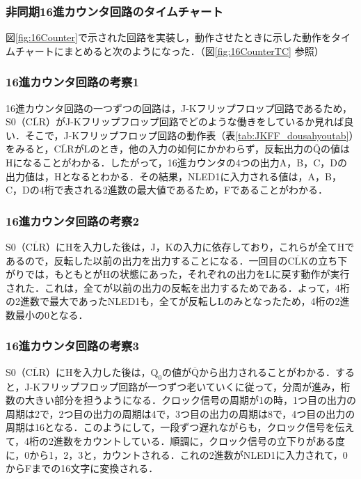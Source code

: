 %
%
\subsubsection{非同期16進カウンタ回路のタイムチャート}
\label{16counter_timechart}
図\ref{fig:16Counter}で示された回路を実装し，動作させたときに示した動作をタイムチャートにまとめると次のようになった．（図\ref{fig:16CounterTC} 参照）

%
%
\subsubsection{16進カウンタ回路の考察1}
\label{16counter_consideration1}
16進カウンタ回路の一つずつの回路は，J-Kフリップフロップ回路であるため，S0（$\overline{\mathrm{CLR}}$）がJ-Kフリップフロップ回路でどのような働きをしているか見れば良い．そこで，J-Kフリップフロップ回路の動作表（表\ref{tab:JKFF_dousahyoutab}）をみると，$\overline{\mathrm{CLR}}$がLのとき，他の入力の如何にかかわらず，反転出力の$\overline{\mathrm{Q}}$の値はHになることがわかる．したがって，16進カウンタの4つの出力A，B，C，Dの出力値は，Hとなるとわかる．その結果，NLED1に入力される値は，A，B，C，Dの4桁で表される2進数の最大値であるため，Fであることがわかる．

%
%
\subsubsection{16進カウンタ回路の考察2}
\label{16counter_consideration2}
S0（$\overline{\mathrm{CLR}}$）にHを入力した後は，J，Kの入力に依存しており，これらが全てHであるので，反転した以前の出力を出力することになる．一回目の$\overline{\mathrm{CLK}}$の立ち下がりでは，もともとがHの状態にあった，それぞれの出力をLに戻す動作が実行された．これは，全てが以前の出力の反転を出力するためである．よって，4桁の2進数で最大であったNLED1も，全てが反転しLのみとなったため，4桁の2進数最小の0となる．

%
%
\subsubsection{16進カウンタ回路の考察3}
\label{16counter_consideration3}
S0（$\overline{\mathrm{CLR}}$）にHを入力した後は，$\mathrm{Q_0}$の値が$\overline{\mathrm{Q}}$から出力されることがわかる．すると，J-Kフリップフロップ回路が一つずつ老いていくに従って，分周が進み，桁数の大きい部分を担うようになる．クロック信号の周期が1の時，1つ目の出力の周期は2で，2つ目の出力の周期は4で，3つ目の出力の周期は8で，4つ目の出力の周期は16となる．このようにして，一段ずつ遅れながらも，クロック信号を伝えて，4桁の2進数をカウントしている．順調に，クロック信号の立下りがある度に，0から1，2，3と，カウントされる．これの2進数がNLED1に入力されて，0からFまでの16文字に変換される．

